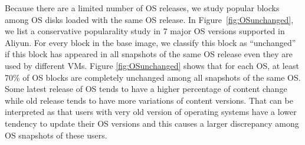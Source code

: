 



Because there are a limited number of OS releases, we study popular blocks among
OS disks loaded with  the same OS release. 
In  Figure~\ref{fig:OSunchanged},  we list a conservative  popularality study in 7 major OS versions  supported
in Aliyun.
For every block in the base image, we classify this block as ``unchanged''
if this block has appeared in all snapshots of the same OS release even they are used by different VMs.
Figure \ref{fig:OSunchanged} shows that for each
OS,  at least 70\% of OS blocks are completely unchanged among all snapshots of the same OS. 
Some latest release  of OS tends to have a higher percentage of content change
while  old release tends to have more variations of content versions.
That can be interpreted as that users with very old  version of operating systems
have a lower tendency to update their OS versions and this causes a larger discrepancy
among OS snapshots of these users.

